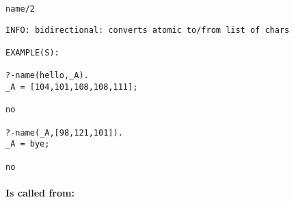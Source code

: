 \begin{verbatim}
name/2
\end{verbatim}

{\small \begin{verbatim}
INFO: bidirectional: converts atomic to/from list of chars

EXAMPLE(S):

?-name(hello,_A).
_A = [104,101,108,108,111];

no

?-name(_A,[98,121,101]).
_A = bye;

no

\end{verbatim}}
\paragraph{Is called from:} 
